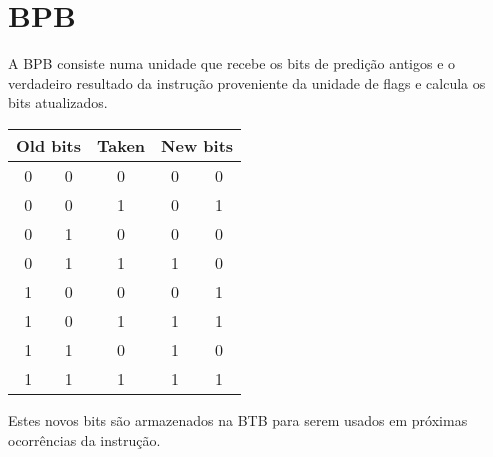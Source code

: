 \section{BPB}
A BPB consiste numa unidade que recebe os bits de predição antigos e o verdadeiro resultado da instrução proveniente da unidade de flags e calcula os bits atualizados.
\begin{table}[H]
	\centering
	\begin{tabular}{cc|c|cc}
		\multicolumn{2}{c|}{Old bits} & Taken & \multicolumn{2}{c}{New bits} \\ \hline
		0 & 0 & 0 & 0 & 0 \\
		0 & 0 & 1 & 0 & 1 \\
		0 & 1 & 0 & 0 & 0 \\
		0 & 1 & 1 & 1 & 0 \\
		1 & 0 & 0 & 0 & 1 \\
		1 & 0 & 1 & 1 & 1 \\
		1 & 1 & 0 & 1 & 0 \\
		1 & 1 & 1 & 1 & 1
	\end{tabular}
\end{table}
Estes novos bits são armazenados na BTB para serem usados em próximas ocorrências da instrução.









